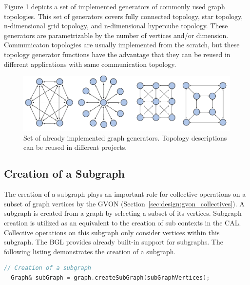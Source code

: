\noindent Figure \ref{fig:topologies} depicts a set of implemented
generators of commonly used graph topologies.  This set of generators
covers fully connected topology, star topology, n-dimensional grid
topology, and n-dimensional hypercube topology.  These generators are
parametrizable by the number of vertices and/or dimension.
Communicaton topologies are usually implemented from the scratch, but
these topology generator functions have the advantage that they can be
reused in different applications with same communication topology.

\begin{figure}[H]
  \centering
  \includegraphics[width=\textwidth]{graphics/40_topologies}
  \caption{Set of already implemented graph generators. Topology
    descriptions can be reused in different projects.}
  \label{fig:topologies}
\end{figure}

\subsection{Creation of a Subgraph}
The creation of a subgraph plays an important role for collective
operations on a subset of graph vertices by the GVON
(Section~\ref{sec:design:gvon_collectives}). A subgraph is created
from a graph by selecting a subset of its vertices.  Subgraph creation is
utilized as an equivalent to the creation of sub contexts in the
CAL. Collective operations on this subgraph only consider vertices
within this subgraph. The BGL provides already built-in support for
subgraphs. The following listing demonstrates the creation of a
subgraph.

\begin{minipage}[t]{\textwidth} 
\begin{lstlisting}[language=C++, label=lst:subgraph]
  // Creation of a subgraph
  Graph& subGraph = graph.createSubGraph(subGraphVertices);
  
\end{lstlisting}
\end{minipage}

